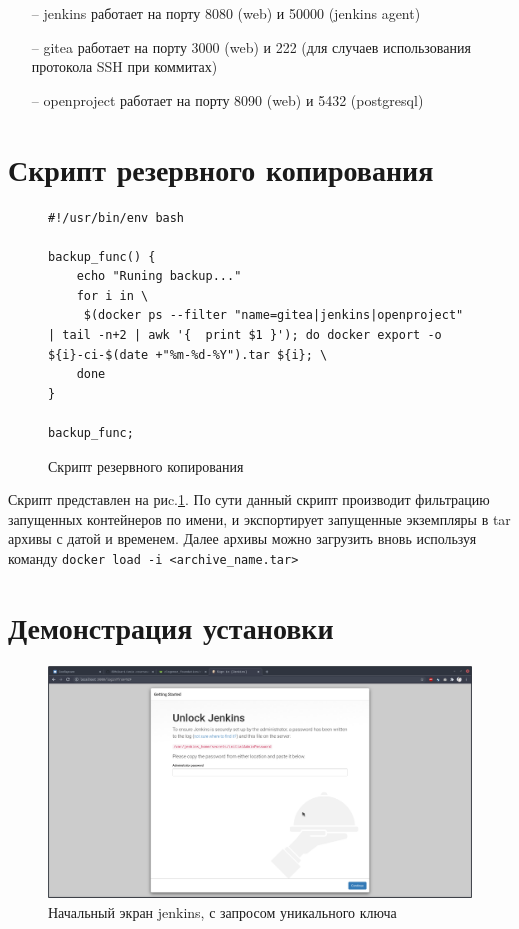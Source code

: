 \documentclass[a4paper]{extarticle}
\begin{document}
\begin{itemize}
\item[--] jenkins работает на порту 8080 (web) и 50000 (jenkins agent)
\item[--] gitea работает на порту 3000 (web) и 222 (для случаев использования протокола SSH при коммитах)
\item[--] openproject работает на порту 8090 (web) и 5432 (postgresql)
\end{itemize}

\section{Скрипт резервного копирования}

\begin{figure}[H]
\begin{verbatim}
#!/usr/bin/env bash

backup_func() {
	echo "Runing backup..."
	for i in \
	 $(docker ps --filter "name=gitea|jenkins|openproject" | tail -n+2 | awk '{  print $1 }'); do docker export -o ${i}-ci-$(date +"%m-%d-%Y").tar ${i}; \
	done
}

backup_func;

\end{verbatim}
\caption{Скрипт резервного копирования}
\label{fig:backup}
\end{figure}

Скрипт представлен на риc.\ref{fig:backup}. По сути данный  скрипт производит фильтрацию запущенных контейнеров по имени, и экспортирует запущенные экземпляры в tar архивы с датой и временем. Далее архивы можно загрузить вновь используя команду 
\texttt{docker load -i <archive\_name.tar>}

\section{Демонстрация установки}

\begin{figure}[H]
\includegraphics[width=\textwidth,height=\textheight,keepaspectratio]{jenkins_setup.png}
\caption{Начальный экран jenkins, с запросом уникального ключа}
\end{figure}
\end{document}
